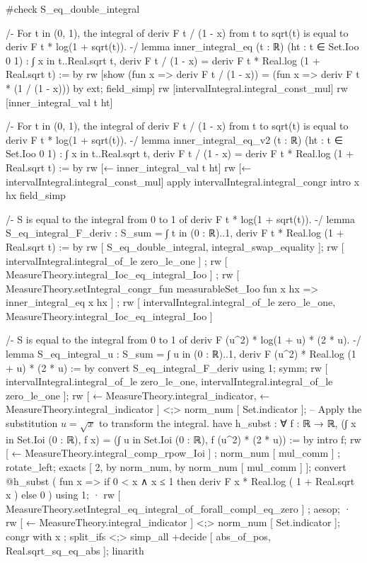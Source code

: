 #check S_eq_double_integral

/-
For t in (0, 1), the integral of deriv F t / (1 - x) from t to sqrt(t) is equal to deriv F t * log(1 + sqrt(t)).
-/
lemma inner_integral_eq (t : ℝ) (ht : t ∈ Set.Ioo 0 1) : ∫ x in t..Real.sqrt t, deriv F t / (1 - x) = deriv F t * Real.log (1 + Real.sqrt t) := by
  rw [show (fun x => deriv F t / (1 - x)) = (fun x => deriv F t * (1 / (1 - x))) by ext; field_simp]
  rw [intervalIntegral.integral_const_mul]
  rw [inner_integral_val t ht]

/-
For t in (0, 1), the integral of deriv F t / (1 - x) from t to sqrt(t) is equal to deriv F t * log(1 + sqrt(t)).
-/
lemma inner_integral_eq_v2 (t : ℝ) (ht : t ∈ Set.Ioo 0 1) : ∫ x in t..Real.sqrt t, deriv F t / (1 - x) = deriv F t * Real.log (1 + Real.sqrt t) := by
  rw [← inner_integral_val t ht]
  rw [← intervalIntegral.integral_const_mul]
  apply intervalIntegral.integral_congr
  intro x hx
  field_simp

/-
S is equal to the integral from 0 to 1 of deriv F t * log(1 + sqrt(t)).
-/
lemma S_eq_integral_F_deriv : S_sum = ∫ t in (0 : ℝ)..1, deriv F t * Real.log (1 + Real.sqrt t) := by
  rw [ S_eq_double_integral, integral_swap_equality ];
  rw [ intervalIntegral.integral_of_le zero_le_one ] ; rw [ MeasureTheory.integral_Ioc_eq_integral_Ioo ] ; rw [ MeasureTheory.setIntegral_congr_fun measurableSet_Ioo fun x hx => inner_integral_eq x hx ] ;
  rw [ intervalIntegral.integral_of_le zero_le_one, MeasureTheory.integral_Ioc_eq_integral_Ioo ]

/-
S is equal to the integral from 0 to 1 of deriv F (u^2) * log(1 + u) * (2 * u).
-/
lemma S_eq_integral_u : S_sum = ∫ u in (0 : ℝ)..1, deriv F (u^2) * Real.log (1 + u) * (2 * u) := by
  convert S_eq_integral_F_deriv using 1;
  symm;
  rw [ intervalIntegral.integral_of_le zero_le_one, intervalIntegral.integral_of_le zero_le_one ];
  rw [ ← MeasureTheory.integral_indicator, ← MeasureTheory.integral_indicator ] <;> norm_num [ Set.indicator ];
  -- Apply the substitution $u = \sqrt{x}$ to transform the integral.
  have h_subst : ∀ {f : ℝ → ℝ}, (∫ x in Set.Ioi (0 : ℝ), f x) = (∫ u in Set.Ioi (0 : ℝ), f (u^2) * (2 * u)) := by
    intro f; rw [ ← MeasureTheory.integral_comp_rpow_Ioi ] ; norm_num [ mul_comm ] ;
    rotate_left;
    exacts [ 2, by norm_num, by norm_num [ mul_comm ] ];
  convert @h_subst ( fun x => if 0 < x ∧ x ≤ 1 then deriv F x * Real.log ( 1 + Real.sqrt x ) else 0 ) using 1;
  · rw [ MeasureTheory.setIntegral_eq_integral_of_forall_compl_eq_zero ] ; aesop;
  · rw [ ← MeasureTheory.integral_indicator ] <;> norm_num [ Set.indicator ];
    congr with x ; split_ifs <;> simp_all +decide [ abs_of_pos, Real.sqrt_sq_eq_abs ];
    linarith

